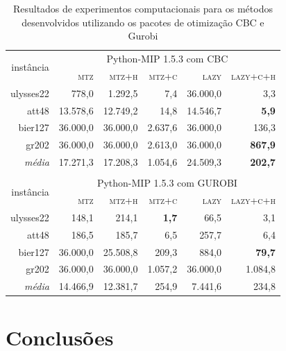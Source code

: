 \documentclass[a4paper,11pt,fleqn]{article}
\begin{document}
\begin{table}
	\begin{center}		
    \caption{Resultados de experimentos computacionais para os métodos desenvolvidos utilizando os pacotes de otimização CBC e Gurobi\vspace{10pt}}
    \label{resExp}
\begin{tabular}{|r|r|r|r|r|r|}
\hline 
\multirow{2}{*}{instância} & \multicolumn{5}{c|}{Python-MIP 1.5.3 com CBC}\tabularnewline
\cline{2-6} \cline{3-6} \cline{4-6} \cline{5-6} \cline{6-6} 
 & \textsc{mtz} & \textsc{mtz+h} & \textsc{mtz+c} & \textsc{lazy} & \textsc{lazy+c+h}\tabularnewline
\hline 
\hline 
ulysses22 & 778,0 & 1.292,5 & 7,4 & \cellcolor{gray}36.000,0 & 3,3\tabularnewline
\hline 
att48 & 13.578,6 & 12.749,2 & 14,8 & 14.546,7 & \textbf{5,9}\tabularnewline
\hline 
bier127 & \cellcolor{gray}36.000,0 & \cellcolor{gray}36.000,0 & 2.637,6 & \cellcolor{gray}36.000,0 & 136,3\tabularnewline
\hline 
gr202 & \cellcolor{gray}36.000,0 & \cellcolor{gray}36.000,0 & 2.613,0 & \cellcolor{gray}36.000,0 & \textbf{867,9}\tabularnewline
\hline 
\hline 
\emph{média} & 17.271,3 & 17.208,3 & 1.054,6 & 24.509,3 & \textbf{202,7}\tabularnewline
\hline 
\multicolumn{1}{r}{} & \multicolumn{1}{r}{} & \multicolumn{1}{r}{} & \multicolumn{1}{r}{} & \multicolumn{1}{r}{} & \multicolumn{1}{r}{}\tabularnewline
\hline 
\multirow{2}{*}{instância} & \multicolumn{5}{c|}{Python-MIP 1.5.3 com GUROBI}\tabularnewline
\cline{2-6} \cline{3-6} \cline{4-6} \cline{5-6} \cline{6-6} 
 & \textsc{mtz} & \textsc{mtz+h} & \textsc{mtz+c} & \textsc{lazy} & \textsc{lazy+c+h}\tabularnewline
\hline 
\hline 
ulysses22 & 148,1 & 214,1 & \textbf{1,7} & 66,5 & 3,1\tabularnewline
\hline 
att48 & 186,5 & 185,7 & 6,5 & 257,7 & 6,4\tabularnewline
\hline 
bier127 & \cellcolor{gray}36.000,0 & 25.508,8 & 209,3 & 884,0 & \textbf{79,7}\tabularnewline
\hline 
gr202 & \cellcolor{gray}36.000,0 & \cellcolor{gray}36.000,0 & 1.057,2 & 36.000,0 & 1.084,8\tabularnewline
\hline 
\hline 
\emph{média} & 14.466,9 & 12.381,7 & 254,9 & 7.441,6 & 234,8\tabularnewline
\hline 
\end{tabular}
	\end{center}	
\end{table}

\section{Conclusões}
\end{document}
